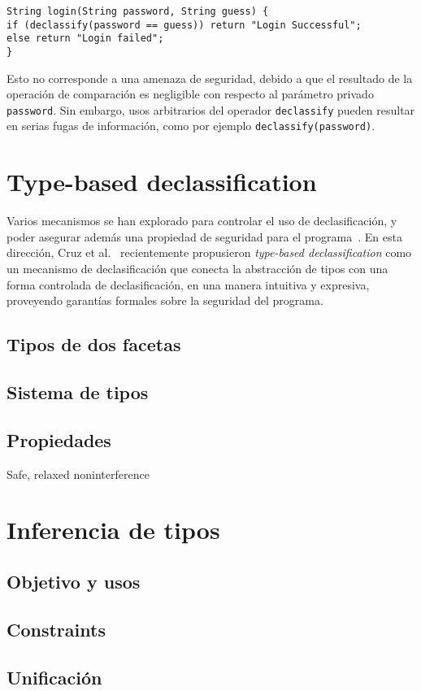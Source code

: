 \begin{lstlisting}
String login(String password, String guess) {
if (declassify(password == guess)) return "Login Successful";
else return "Login failed";
}
\end{lstlisting}

Esto no corresponde a una amenaza de seguridad, debido a que el resultado de la operación de comparación es negligible con respecto al parámetro privado \texttt{password}. Sin embargo, usos arbitrarios del operador \texttt{declassify} pueden resultar en serias fugas de información, como por ejemplo \texttt{declassify(password)}.

\section{Type-based declassification}
Varios mecanismos se han explorado para controlar el uso de declasificación, y poder asegurar además una propiedad de seguridad para el programa~\cite{sabelfeldSands:JCS09}. En esta dirección, Cruz et al.~\cite{cruzAl:ecoop2017} recientemente propusieron \textit{type-based declassification} como un mecanismo de declasificación que conecta la abstracción de tipos con una forma controlada de declasificación, en una manera intuitiva y expresiva, proveyendo garantías formales sobre la seguridad del programa.
\subsection{Tipos de dos facetas}
\subsection{Sistema de tipos}
\subsection{Propiedades}
Safe, relaxed noninterference

\section{Inferencia de tipos}
\subsection{Objetivo y usos}
\subsection{Constraints}
\subsection{Unificación}
